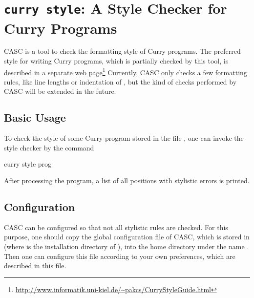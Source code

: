 \section{\texttt{curry style}: A Style Checker for Curry Programs}
\label{sec-casc}

CASC
is a tool to check the formatting style of Curry programs.
The preferred style for writing Curry programs,
which is partially checked by this tool,
is described in a separate web page\footnote{%
\url{http://www.informatik.uni-kiel.de/~pakcs/CurryStyleGuide.html}}
Currently, CASC only checks a few formatting rules, like
line lengths or
indentation of , but the kind of checks
performed by CASC will be extended in the future.

\subsection{Basic Usage}

To check the style of some Curry program stored
in the file ,
one can invoke the style checker by
the command
%
\begin{curry}
curry style prog
\end{curry}
%
After processing the program, a list of all positions
with stylistic errors is printed.


\subsection{Configuration}

CASC can be configured so that not all stylistic rules are checked.
For this purpose, one should copy the global configuration file of CASC,
which is stored in 
(where \cyshome is the installation directory of \CYS),
into the home directory under the name .
Then one can configure this file according to your own preferences,
which are described in this file.

